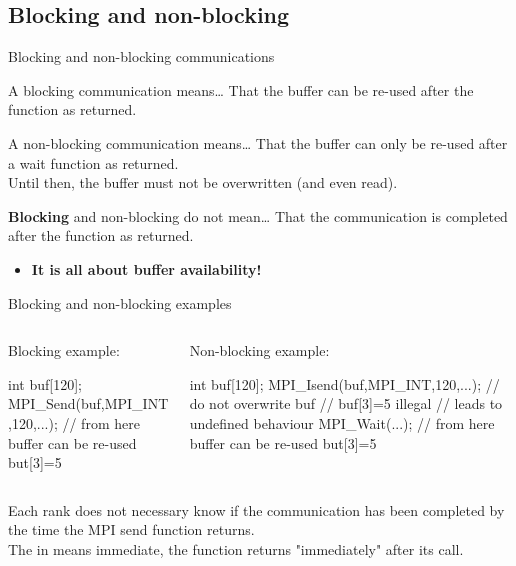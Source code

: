 \documentclass[aspectratio=43]{beamer}
\begin{document}
\subsection{Blocking and non-blocking}
\begin{frame}{Blocking and non-blocking communications}
\begin{green1block}{A blocking communication means\ldots}
    That the buffer can be re-used after the function as returned.
\end{green1block}
\begin{green1block}{A non-blocking communication means\ldots}
    That the buffer can only be re-used after a wait function as returned.\\
    Until then, the buffer must not be overwritten (and even read).
\end{green1block}
\begin{red1block}{\textbf{Blocking} and non-blocking do not mean\ldots}
    That the communication is completed after the function as returned.
\end{red1block}
\begin{itemize}
    \item<2>[\color{cscsred}$\Rightarrow$]\color{cscsred}\textbf{It is all about buffer availability!}
\end{itemize}
\end{frame}


\begin{frame}[fragile]{Blocking and non-blocking examples}
    \begin{columns}
        \begin{column}{0.4\paperwidth}
            Blocking example:
\begin{Cpplisting}[]{}
int buf[120];
MPI_Send(buf,MPI_INT,120,...);
// from here buffer can be re-used
but[3]=5
\end{Cpplisting}
        \end{column}
        \begin{column}{0.4\paperwidth}
            Non-blocking example:
\begin{Cpplisting}[]{}
int buf[120];
MPI_Isend(buf,MPI_INT,120,...);
// do not overwrite buf
// buf[3]=5 illegal
// leads to undefined behaviour
MPI_Wait(...);
// from here buffer can be re-used
but[3]=5
\end{Cpplisting}
        \end{column}
    \end{columns}
Each rank does not necessary know if the communication has been completed by the time the MPI send function returns.\\
The  in  means {\color{cscsred}immediate}, the function returns "immediately" after its call.
\end{frame}
\end{document}
